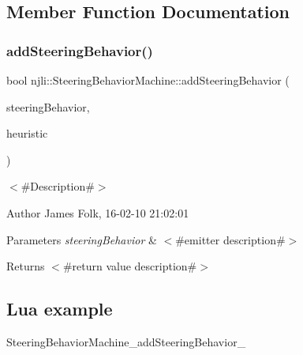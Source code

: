 \subsection{Member Function Documentation}
\mbox{\label{classnjli_1_1_steering_behavior_machine_aea8d4a3f11d710510a6362acc5e37f8d}} 
\subsubsection{\texorpdfstring{add\+Steering\+Behavior()}{addSteeringBehavior()}}
{\footnotesize\ttfamily bool njli\+::\+Steering\+Behavior\+Machine\+::add\+Steering\+Behavior (\begin{DoxyParamCaption}\item[{\mbox{\hyperlink{classnjli_1_1_steering_behavior}{Steering\+Behavior}} $\ast$}]{steering\+Behavior,  }\item[{\mbox{\hyperlink{_util_8h_a5f6906312a689f27d70e9d086649d3fd}{f32}}}]{heuristic }\end{DoxyParamCaption})}



$<$\#\+Description\#$>$ 

\begin{DoxyAuthor}{Author}
James Folk, 16-\/02-\/10 21\+:02\+:01
\end{DoxyAuthor}

\begin{DoxyParams}{Parameters}
{\em steering\+Behavior} & $<$\#emitter description\#$>$\\
\hline
\end{DoxyParams}
\begin{DoxyReturn}{Returns}
$<$\#return value description\#$>$
\end{DoxyReturn}
\hypertarget{classnjli_1_1_steering_behavior_wander_ex1}{}\subsection{Lua example}\label{classnjli_1_1_steering_behavior_wander_ex1}

\begin{DoxyCodeInclude}
\end{DoxyCodeInclude}
Steering\+Behavior\+Machine\+\_\+add\+Steering\+Behavior\+\_\+ \mbox{\label{classnjli_1_1_steering_behavior_machine_ae9872ddbb50d792d826fd85059f96507}} 
